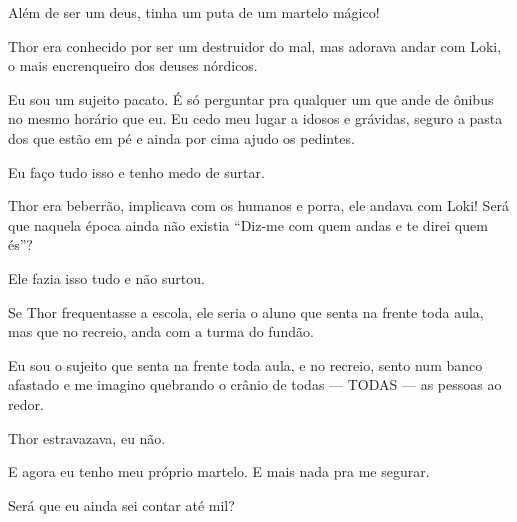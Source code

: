 Além de ser um deus, tinha um puta de um martelo mágico!

Thor era conhecido por ser um destruidor do mal, mas adorava andar com Loki, o mais encrenqueiro dos deuses nórdicos.

Eu sou um sujeito pacato. É só perguntar pra qualquer um que ande de ônibus no mesmo horário que eu. Eu cedo meu lugar a idosos e grávidas, seguro a pasta dos que estão em pé e ainda por cima ajudo os pedintes.

Eu faço tudo isso e tenho medo de surtar.

Thor era beberrão, implicava com os humanos e porra, ele andava com Loki! Será que naquela época ainda não existia ``Diz-me com quem andas e te direi quem és''?

Ele fazia isso tudo e não surtou.

Se Thor frequentasse a escola, ele seria o aluno que senta na frente toda aula, mas que no recreio, anda com a turma do fundão.

Eu sou o sujeito que senta na frente toda aula, e no recreio, sento num banco afastado e me imagino quebrando o crânio de todas --- TODAS --- as pessoas ao redor.

Thor estravazava, eu não.

E agora eu tenho meu próprio martelo. E mais nada pra me segurar.

Será que eu ainda sei contar até mil?
